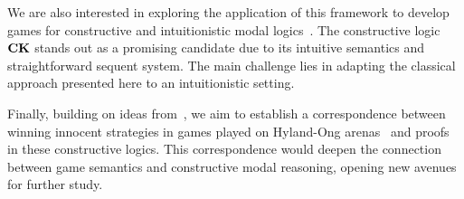 We are also  interested in exploring the application of this framework to develop games for constructive and intuitionistic modal logics~\cite{Fitch,plotkin:stirling:86,Sim94,DBLP:journals/sLogica/BiermanP00}. The constructive logic $\textbf{CK}$ stands out as a promising candidate due to its intuitive semantics and straightforward sequent system. The main challenge lies in adapting the classical approach presented here to an intuitionistic setting. %

Finally, building on ideas from~\cite{DBLP:conf/tableaux/AcclavioCS21,DBLP:conf/eumas/AcclavioC23}, we aim to establish a correspondence between winning innocent strategies in games played on Hyland-Ong arenas~\cite{DBLP:journals/iandc/HylandO00} and proofs in these constructive logics. This correspondence would deepen the connection between game semantics and constructive modal reasoning, opening new avenues for further study.

 
